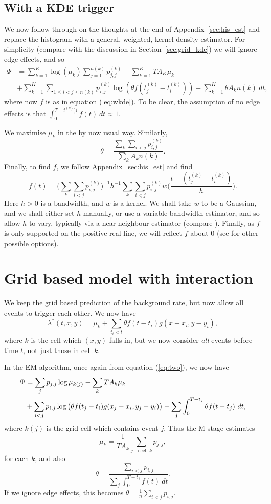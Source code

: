 \documentclass[twoside,a4paper]{article}
\theoremstyle{plain}
\theoremstyle{definition}
\begin{document}
\subsection{With a KDE trigger}\label{app:grid_kde}

We now follow through on the thoughts at the end of Appendix~\ref{sec:his_est}
and replace the histogram with a general, weighted, kernel density estimator.
For simplicity (compare with the discussion in Section~\ref{sec:grid_kde}) we will
ignore edge effects, and so
\begin{align*}
\Psi &= \sum_{k=1}^K \log(\mu_k) \sum_{j=1}^{n(k)} p^{(k)}_{j,j}
  - \sum_{k=1}^K TA_K\mu_k \\
&+\sum_{k=1}^K \sum_{1\leq i<j\leq n(k)} p^{(k)}_{i,j} \log(\theta f(t^{(k)}_j - t^{(k)}_i))
- \sum_{k=1}^K \theta A_k n(k) \ dt,
\end{align*}
where now $f$ is as in equation (\ref{eq:wkde}).  To be clear, the assumption of
no edge effects is that $\int_0^{T-t^{(k)})i} f(t) \ dt \approx 1$.

We maximise $\mu_k$ in the by now usual way.  Similarly,
\[ \theta = \frac{\sum_k\sum_{i<j} p^{(k)}_{i,j}}{\sum_k A_k n(k)}. \]
Finally, to find $f$, we follow Appendix~\ref{sec:his_est} and find
\[ f(t) = \Big( \sum_k \sum_{i<j} p^{(k)}_{i,j} \Big)^{-1}
h^{-1} \sum_k \sum_{i<j} p^{(k)}_{i,j} w\Big( \frac{t - (t^{(k)}_j - t^{(k)}_i)}{h} \Big).
\]
Here $h>0$ is a bandwidth, and $w$ is a kernel.  We shall take $w$ to be a Gaussian, and we
shall either set $h$ manually, or use a variable bandwidth estimator, and so allow $h$ to
vary, typically via a near-neighbour estimator (compare \cite[Appendix]{sepp}).
Finally, as $f$ is only supported on the positive real line, we will reflect $f$ about $0$
(see \cite[Section~2.10]{sil} for other possible options).




\section{Grid based model with interaction}\label{app:grid_interact}

We keep the grid based prediction of the background rate, but now allow all events to
trigger each other.  We now have
\[ \lambda^*(t,x,y) = \mu_k + \sum_{t_i<t} \theta f(t-t_i) g(x-x_i, y-y_i), \]
where $k$ is the cell which $(x,y)$ falls in, but we now consider \emph{all} events before
time $t$, not just those in cell $k$.

In the EM algorithm, once again from equation (\ref{eq:two}), we now have
\begin{align}
\Psi &= \sum_j p_{j,j} \log \mu_{k(j)} - \sum_k T A_k \mu_k \notag \\
&+ \sum_{i<j} p_{i,j} \log\big(\theta f(t_j-t_i) g(x_j-x_i, y_j-y_i)\big)
- \sum_j \int_0^{T-t_j} \theta f(t-t_j) \ dt,
\label{eq:gen_one}
\end{align}
where $k(j)$ is the grid cell which contains event $j$.  Thus the M stage estimates
\[ \mu_k = \frac{1}{TA_k} \sum_{j\text{ in cell }k} p_{j,j}, \]
for each $k$, and also
\[ \theta = \frac{\sum_{i<j} p_{i,j}}{\sum_j \int_0^{T-t_j} f(t) \ dt}. \]
If we ignore edge effects, this becomes $\theta = \frac{1}{n} \sum_{i<j} p_{i,j}$.
\end{document}
